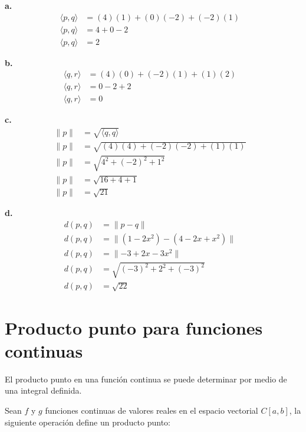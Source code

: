 \documentclass{article}
\begin{document}
    \textbf{a.}
        \begin{align*}
            \langle p,q\rangle&= (4)(1)+(0)(-2)+(-2)(1) & \\
            \langle p,q\rangle&= 4+0-2 & \\
            \langle p,q\rangle&= 2
        \end{align*}

    \textbf{b.}
        \begin{align*}
            \langle q,r\rangle&= (4)(0)+(-2)(1)+(1)(2) & \\
            \langle q,r\rangle&= 0-2+2 & \\
            \langle q,r\rangle&= 0
        \end{align*}

    \textbf{c.}
        \begin{align*}
            \parallel p\parallel&= \sqrt{\langle q,q\rangle} & \\
            \parallel p\parallel&= \sqrt{(4)(4)+(-2)(-2)+(1)(1)} \\
            \parallel p\parallel&=\sqrt{4^{2}+(-2)^{2}+1^{2}} & \\
            \parallel p\parallel&= \sqrt{16+4+1} & \\
            \parallel p\parallel&= \sqrt{21}
        \end{align*}

    \textbf{d.}
        \begin{align*}
            d(p,q)&= \parallel p-q\parallel & \\
            d(p,q)&= \parallel (1-2x^{2})-(4-2x+x^{2})\parallel & \\
            d(p,q)&= \parallel -3+2x-3x^{2}\parallel & \\
            d(p,q)&= \sqrt{(-3)^{2}+2^{2}+(-3)^{2}} & \\
            d(p,q)&= \sqrt{22}
        \end{align*}

\section{Producto punto para funciones continuas}

    El producto punto en una función continua se puede determinar por medio de una integral definida.

    Sean $f$ y $g$ funciones continuas de valores reales en el espacio vectorial $C[a, b]$, la siguiente operación define un producto punto:
\end{document}
